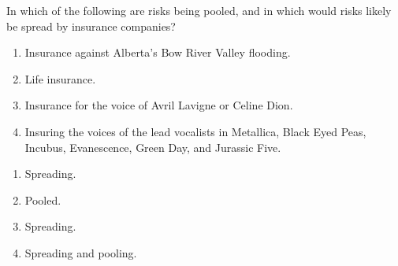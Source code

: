 \begin{enumialphparenastyle}
\begin{ex}\label{ex:ch7ex3}
In which of the following are risks being pooled, and in which would risks likely be spread by insurance companies?
\begin{enumerate}
	\item	Insurance against Alberta's Bow River Valley flooding.
	\item	Life insurance.
	\item	Insurance for the voice of Avril Lavigne or Celine Dion.
	\item	Insuring the voices of the lead vocalists in Metallica, Black Eyed Peas, Incubus, Evanescence, Green Day, and Jurassic Five.
\end{enumerate}
\begin{sol}
\begin{enumerate}
	\item	Spreading.
	\item	Pooled.
	\item	Spreading.
	\item	Spreading and pooling.
\end{enumerate}
\end{sol}
\end{ex}


\end{enumialphparenastyle}
